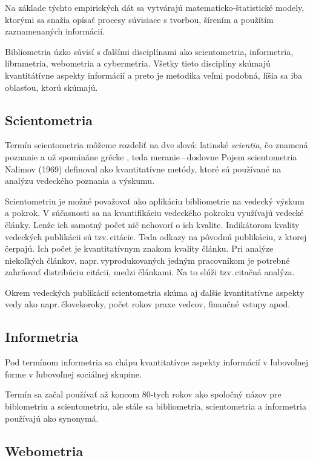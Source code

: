 Na základe týchto empirických dát sa vytvárajú matematicko-štatistické modely,
ktorými sa snažia opísať procesy súvisiace s tvorbou, šírením a použítím
zaznamenaných informácií.

Bibliometria úzko súvisí s ďalšími disciplínami ako scientometria, informetria,
librametria, webometria a cybermetria.  Všetky tieto disciplíny skúmajú
kvantitátívne aspekty informácií a preto je metodika veľmi podobná, líšia sa iba
oblasťou, ktorú skúmajú.


\subsection{Scientometria}

Termín scientometria môžeme rozdeliť na dve slová: latinské \emph{scientia}, čo
znamená poznanie a už spomináne grécke , teda
meranie\,--\,doslovne  Pojem scientometria Nalimov (1969)
definoval ako kvantitatívne metódy, ktoré sú používané na analýzu vedeckého
poznania a výskumu.

Scientometriu je možné považovať ako aplikáciu bibliometrie na vedecký výskum a
pokrok.  V súčasnosti sa na kvantifikáciu vedeckého pokroku využívajú vedecké
články.  Lenže ich samotný počet nič nehovorí o ich kvalite.  Indikátorom
kvality vedeckých publikácii sú tzv.\,citácie.  Teda odkazy na pôvodnú
publikáciu, z ktorej čerpajú.  Ich počet je kvantitatívnym znakom kvality
článku.  Pri analýze niekoľkých článkov, napr.\,vyprodukovaných jedným
pracovníkom je potrebné zahrňovať distribúciu citácii, medzi článkami.  Na to
slúži tzv.\,citačná analýza.

Okrem vedeckých publikácií scientometria skúma aj ďalšie kvantitatívne aspekty
vedy ako napr.\,človekoroky, počet rokov praxe vedcov, finančné vstupy apod.
\citet{Bellis2009}


\subsection{Informetria}

Pod termínom informetria sa chápu kvantitatívne aspekty informácií v ľubovoľnej
forme v ľubovoľnej sociálnej skupine.

Termín sa začal používať až koncom 80-tych rokov ako spoločný názov pre
biblometriu a scientometriu, ale stále sa bibliometria, scientometria a
informetria používajú ako synonymá.


\subsection{Webometria}

